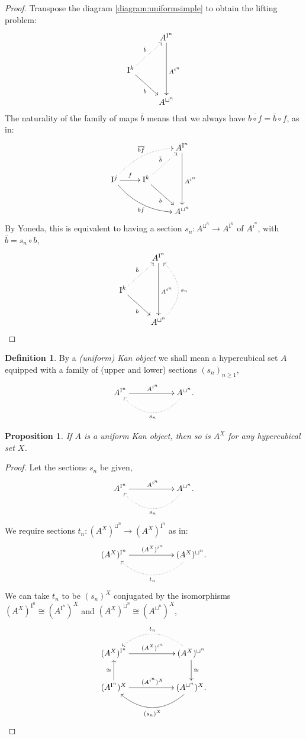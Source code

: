 \documentclass[11pt]{article}
\newcommand{\I}{\ensuremath{\mathrm{I}}}
\newtheorem{proposition}[theorem]{Proposition}
\theoremstyle{remark}
\theoremstyle{definition}
\newtheorem{definition}[theorem]{Definition}
\begin{document}
\begin{proof}
Transpose the diagram \eqref{diagram:uniformsimple} to obtain the lifting problem:
\begin{equation*}
\xymatrix{
	& A^{\I^n}  \ar[dd]^{A^{i^n}}\\
\I^k \ar@{..>}[ru]^{\bar{b}}  \ar[rd]_{b} & \\
	& A^{\sqcup^n} 
}
\end{equation*}
The naturality of the family of maps $\bar{b}$ means that we always have $\overline{b\circ f} = \bar{b}\circ f$, as in:
\begin{equation}
\xymatrix{
	&& A^{\I^n}  \ar[dd]^{A^{i^n}}\\
\I^j \ar[r]^{f} \ar@{..>}@/{}^{1pc}/[rru]^{\overline{bf}} \ar@/{}_{1pc}/[rrd]_{bf} & \I^k \ar@{..>}[ru]^{\bar{b}}  \ar[rd]_{b} & \\
	&& A^{\sqcup^n} 
}
\end{equation}
By Yoneda, this is equivalent to having a section $s_n : A^{\sqcup^n}  \to A^{\I^n}$ of $A^{i^n}$, with $\bar{b} = s_n\circ b$,
\begin{equation}
\xymatrix{
	& A^{\I^n}  \ar[dd]^{A^{i^n}}\\
\I^k \ar@{..>}[ru]^{\bar{b}}  \ar[rd]_{b} & \\
	& A^{\sqcup^n}  \ar@{..>}@/{}_{2pc}/[uu]_{s_n}
}
\end{equation}
\end{proof}

\begin{definition} By a \emph{(uniform) Kan object} we shall mean a hypercubical set $A$ equipped with a family of (upper and lower) sections $(s_n)_{n\geq 1}$, 
\[
\xymatrix{
A^{\I^n} \ar[rr]^{A^{i^n}} & & \ar@{.>}@/{}^{2pc}/[ll]^{s_n} A^{\sqcup^n}.
}
\]
\end{definition}

\begin{proposition}\label{prop:coqexp}
If $A$ is a uniform Kan object, then so is $A^X$ for any hypercubical set $X$.
\end{proposition}
\begin{proof}
Let the sections $s_n$ be given,
\[
\xymatrix{
A^{\I^n} \ar[rr]^{A^{i^n}} & & \ar@{.>}@/{}^{2pc}/[ll]^{s_n} A^{\sqcup^n}.
}
\]
We require sections $t_n : (A^X)^{\sqcup^n} \to (A^X)^{\I^n}$ as in:
\[
\xymatrix{
(A^X)^{\I^n} \ar[rr]^{(A^X)^{i^n}} & & \ar@{.>}@/{}^{2pc}/[ll]^{t_n} (A^X)^{\sqcup^n}.
}
\]
We can take $t_n$ to be $(s_n)^X$ conjugated by the isomorphisms $(A^X)^{\I^n} \cong (A^{\I^n})^X$ and $(A^X)^{\sqcup^n} \cong (A^{\sqcup^n})^X$,
\[
\xymatrix{
(A^X)^{\I^n} \ar[rr]^{(A^X)^{i^n}} & & \ar@{.>}@/{}_{2pc}/[ll]_{t_n} (A^X)^{\sqcup^n} \ar[d]^{\cong} \\
(A^{\I^n})^X \ar[rr]^{(A^{i^n})^X}  \ar[u]^{\cong} & & \ar@/{}^{2pc}/[ll]^{(s_n)^X} (A^{\sqcup^n})^X.
}
\]
\end{proof}
\end{document}
